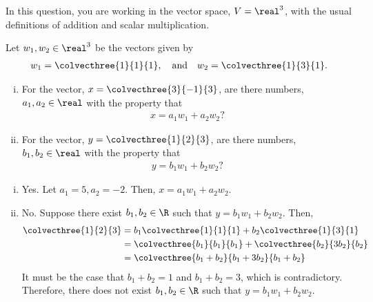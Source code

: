 \begin{question}\label{que:TowardsSpan}
	\normalfont
	
	In this question, you are working in the vector space, $V=\real^3$, with the usual definitions of addition and scalar multiplication.  
	
	Let $w_1, w_2\in\real^3$ be the vectors given by 
	\[
        \begin{aligned}
            w_1 = \colvecthree{1}{1}{1},\ \ \ \text{and}\ \ \ w_2 = \colvecthree{1}{3}{1}.
        \end{aligned}
    \]
    \begin{enumerate}[(i)]
		\item For the vector, $\displaystyle x = \colvecthree{3}{-1}{3}$, are there numbers, $a_1,a_2\in\real$ with the property that
		\[
            \begin{aligned}
			    x = a_1 w_1 + a_2 w_2?
		    \end{aligned}
		\]
		\item For the vector, $\displaystyle y = \colvecthree{1}{2}{3}$, are there numbers, $b_1,b_2\in\real$ with the property that
        \[
            \begin{aligned}
                y = b_1 w_1 + b_2 w_2?
            \end{aligned}
        \]
	\end{enumerate}
\end{question}
\begin{sol}
    \begin{enumerate}[(i)]
        \item Yes. Let $a_1=5, a_2=-2.$ Then, $x=a_1w_1+a_2w_2$.
        \item No. Suppose there exist $b_1,b_2\in\R$ such that $y=b_1w_1+b_2w_2$. Then, 
        \[
            \begin{aligned}
                \colvecthree{1}{2}{3} &= b_1 \colvecthree{1}{1}{1}+b_2 \colvecthree{1}{3}{1}\\
                                      &= \colvecthree{b_1}{b_1}{b_1}+\colvecthree{b_2}{3b_2}{b_2}\\
                                      &= \colvecthree{b_1+b_2}{b_1+3b_2}{b_1+b_2}
            \end{aligned}
        \]
        It must be the case that $b_1+b_2=1$ and $b_1+b_2=3$, which is contradictory. Therefore, there does not exist $b_1,b_2\in\R$ such that $y=b_1w_1+b_2w_2$.
    \end{enumerate}
    
\end{sol}